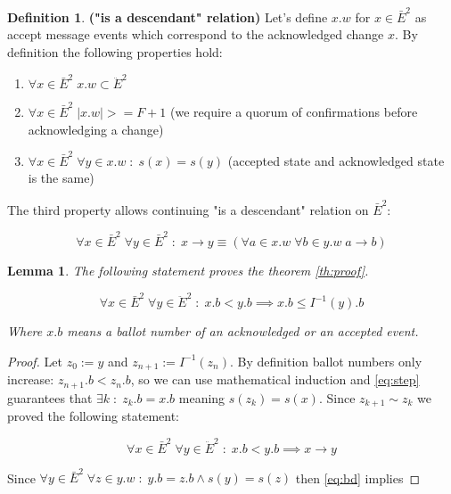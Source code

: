 \documentclass[12pt]{article}
\newtheorem{lemma}[theorem]{Lemma}
\theoremstyle{definition}
\newtheorem*{definition}{Definition}
\begin{document}
\begin{appendices}
\begin{definition}{\bf("is a descendant" relation)}
  Let's define $x.w$ for $x \in \bar{E}^2$ as accept message events which correspond to the acknowledged change $x$. By definition the following properties hold:
  \begin{enumerate}
    \item $\forall x \in \bar{E}^2 \; x.w \subset \ddot{E}^2$
    \item $\forall x \in \bar{E}^2 \; |x.w| >= F+1$ (we require a quorum of confirmations before acknowledging a change)
    \item $\forall x \in \bar{E}^2 \; \forall y \in x.w \;:\; s(x) = s(y)$ (accepted state and acknowledged state is the same)
  \end{enumerate}
  
  The third property allows continuing "is a descendant" relation on $\bar{E}^2$:
  
  \begin{equation}
    \forall x \in \bar{E}^2 \; \forall y \in \bar{E}^2 \;:\; x \to y \equiv (\forall a \in x.w \; \forall b \in y.w \; a \to b)
  \end{equation}
\end{definition}

\begin{lemma}
  The following statement proves the theorem \ref{th:proof}.

  \begin{equation} \label{eq:step}
    \forall x \in \bar{E}^2 \; \forall y \in \ddot{E}^2 \;:\; x.b < y.b \implies x.b \leq I^{-1}(y).b
  \end{equation}

  Where $x.b$ means a ballot number of an acknowledged or an accepted event.
\end{lemma}

\begin{proof}
  Let $z_0 := y$ and $z_{n+1} := I^{-1}(z_{n})$. By definition ballot numbers only increase: $z_{n+1}.b < z_{n}.b$, so we can use mathematical induction and \ref{eq:step} guarantees that $\exists k \;:\; z_k.b = x.b$ meaning $s(z_k) = s(x)$. Since $z_{k+1} \sim z_k$ we proved the following statement:

  \begin{equation} \label{eq:bd}
    \forall x \in \bar{E}^2 \; \forall y \in \ddot{E}^2 \;:\; x.b < y.b \implies x \to y
  \end{equation}

  Since $\forall y \in \bar{E}^2 \; \forall z \in y.w \;:\; y.b=z.b \land s(y)=s(z)$ then \ref{eq:bd} implies


\end{proof}
\end{appendices}
\end{document}
